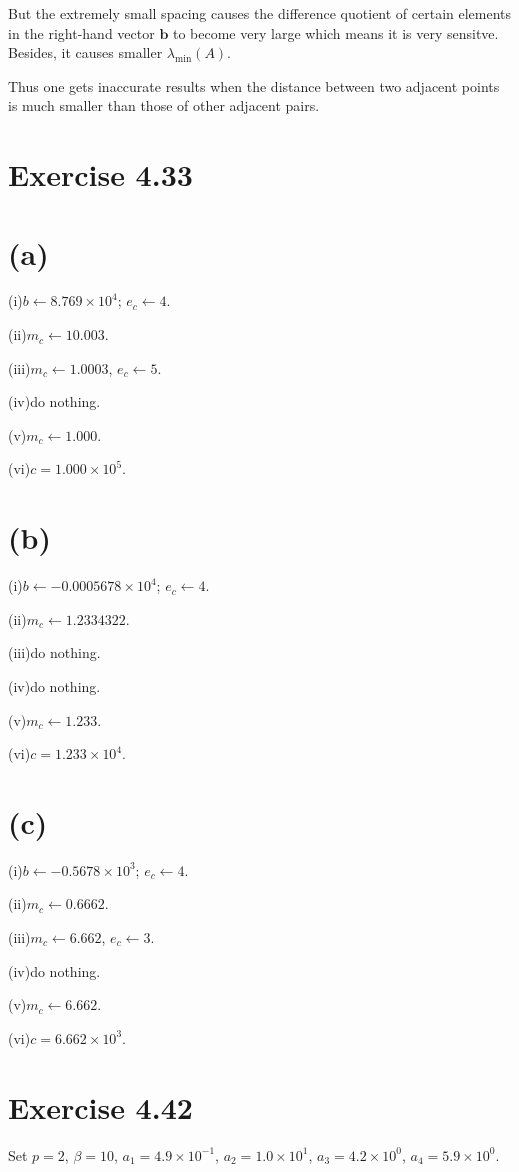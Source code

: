 \documentclass[a4paper]{article}
\begin{document}
But the extremely small spacing causes the difference quotient of certain elements in the right-hand vector $\mathbf{b}$ to become very large which means it is very sensitve. Besides, it causes smaller $\lambda_{\min}(A)$.

Thus one gets inaccurate results when the distance between two adjacent points is much smaller than those of other adjacent pairs. 



\section*{Exercise 4.33}
\section*{(a)}
(i)$b\leftarrow 8.769\times 10^4$; $e_c\leftarrow 4$.

(ii)$m_c\leftarrow 10.003$.

(iii)$m_c\leftarrow 1.0003$, $e_c\leftarrow 5$.

(iv)do nothing.

(v)$m_c\leftarrow 1.000$.

(vi)$c=1.000\times 10^5$.

\section*{(b)}
(i)$b\leftarrow -0.0005678\times 10^4$; $e_c\leftarrow 4$.

(ii)$m_c\leftarrow 1.2334322$.

(iii)do nothing.

(iv)do nothing.

(v)$m_c\leftarrow 1.233$.

(vi)$c=1.233\times 10^4$.

\section*{(c)}
(i)$b\leftarrow -0.5678\times 10^3$; $e_c\leftarrow 4$.

(ii)$m_c\leftarrow 0.6662$.

(iii)$m_c\leftarrow 6.662$, $e_c\leftarrow 3$.

(iv)do nothing.

(v)$m_c\leftarrow 6.662$.

(vi)$c=6.662\times 10^3$.

\section*{Exercise 4.42}
Set $p=2$, $\beta=10$, $a_1=4.9 \times 10^{-1}$, $a_2=1.0\times 10^1$, $a_3=4.2\times 10^0$, $a_4= 5.9\times 10^0$.
\end{document}
